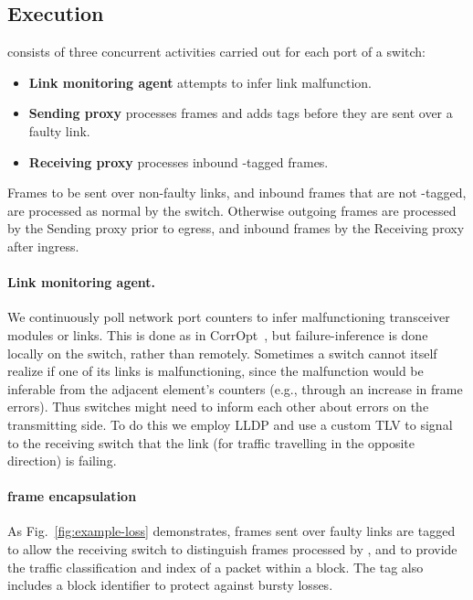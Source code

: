 \subsection{Execution}
\OurSys consists of three concurrent activities carried out for each port of a
switch:
\begin{itemize}
  \item \textbf{Link monitoring agent} attempts to infer link malfunction.
  \item \textbf{Sending proxy} processes frames and adds tags before they are sent over a faulty link.
  \item \textbf{Receiving proxy} processes inbound \OurSys-tagged frames.
\end{itemize}

Frames to be sent over non-faulty links, and inbound frames that are not
\OurSys-tagged, are processed as normal by the switch. Otherwise outgoing frames
are processed by the Sending proxy prior to egress, and inbound frames by
the Receiving proxy after ingress.

\paragraph{Link monitoring agent.}
  We continuously poll network port counters to infer malfunctioning transceiver
  modules or links. This is done as in
  CorrOpt~\cite{Zhuo:2017:UMP:3098822.3098849}, but failure-inference is done
  locally on the switch, rather than remotely.
  Sometimes a switch cannot itself realize if one of its links is
  malfunctioning, since the malfunction would be inferable from the adjacent
  element's counters (e.g., through an increase in frame errors). Thus switches
  might need to inform each other about errors on the transmitting side. To do
  this we employ LLDP and use a custom TLV to signal to the receiving switch
  that the link (for traffic travelling in the opposite direction) is failing.

\paragraph{\OurSys frame encapsulation}
As Fig.~\ref{fig:example-loss} demonstrates, frames sent over faulty links are tagged to allow the receiving switch to distinguish frames processed by \OurSys, and to provide the traffic classification and index of a packet within a block. The tag also includes a block identifier to protect against bursty losses.

